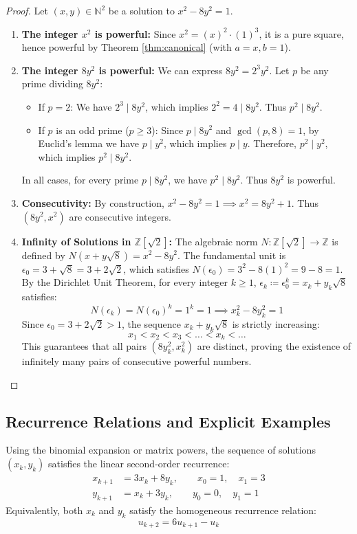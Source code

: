 \documentclass[11pt,a4paper]{article}
\theoremstyle{definition}
\begin{document}
\begin{proof}
Let $(x, y) \in \mathbb{N}^2$ be a solution to $x^2 - 8y^2 = 1$.
\begin{enumerate}
    \item \textbf{The integer $x^2$ is powerful:}
    Since $x^2 = (x)^2 \cdot (1)^3$, it is a pure square, hence powerful by Theorem \ref{thm:canonical} (with $a=x, b=1$).
    \item \textbf{The integer $8y^2$ is powerful:}
    We can express $8y^2 = 2^3 y^2$.
    Let $p$ be any prime dividing $8y^2$:
    \begin{itemize}
        \item If $p = 2$: We have $2^3 \mid 8y^2$, which implies $2^2 = 4 \mid 8y^2$. Thus $p^2 \mid 8y^2$.
        \item If $p$ is an odd prime ($p \ge 3$): Since $p \mid 8y^2$ and $\gcd(p, 8) = 1$, by Euclid's lemma we have $p \mid y^2$, which implies $p \mid y$.
        Therefore, $p^2 \mid y^2$, which implies $p^2 \mid 8y^2$.
    \end{itemize}
    In all cases, for every prime $p \mid 8y^2$, we have $p^2 \mid 8y^2$. Thus $8y^2$ is powerful.
    \item \textbf{Consecutivity:}
    By construction, $x^2 - 8y^2 = 1 \implies x^2 = 8y^2 + 1$. Thus $(8y^2, x^2)$ are consecutive integers.
    \item \textbf{Infinity of Solutions in $\mathbb{Z}[\sqrt{2}]$:}
    The algebraic norm $N : \mathbb{Z}[\sqrt{2}] \to \mathbb{Z}$ is defined by $N(x + y\sqrt{8}) = x^2 - 8y^2$.
    The fundamental unit is $\epsilon_0 = 3 + \sqrt{8} = 3 + 2\sqrt{2}$, which satisfies $N(\epsilon_0) = 3^2 - 8(1)^2 = 9 - 8 = 1$.
    By the Dirichlet Unit Theorem, for every integer $k \ge 1$, $\epsilon_k \coloneqq \epsilon_0^k = x_k + y_k \sqrt{8}$ satisfies:
    \[ N(\epsilon_k) = N(\epsilon_0)^k = 1^k = 1 \implies x_k^2 - 8y_k^2 = 1 \]
    Since $\epsilon_0 = 3 + 2\sqrt{2} > 1$, the sequence $x_k + y_k\sqrt{8}$ is strictly increasing:
    \[ x_1 < x_2 < x_3 < \dots < x_k < \dots \]
    This guarantees that all pairs $(8y_k^2, x_k^2)$ are distinct, proving the existence of infinitely many pairs of consecutive powerful numbers.
\end{enumerate}
\end{proof}

\subsection{Recurrence Relations and Explicit Examples}
Using the binomial expansion or matrix powers, the sequence of solutions $(x_k, y_k)$ satisfies the linear second-order recurrence:
\begin{align}
x_{k+1} &= 3 x_k + 8 y_k, \qquad x_0 = 1, \quad x_1 = 3 \label{eq:rec_x} \\
y_{k+1} &= x_k + 3 y_k, \qquad y_0 = 0, \quad y_1 = 1 \label{eq:rec_y}
\end{align}
Equivalently, both $x_k$ and $y_k$ satisfy the homogeneous recurrence relation:
\begin{equation}\label{eq:rec_homo}
u_{k+2} = 6 u_{k+1} - u_k
\end{equation}
\end{document}
